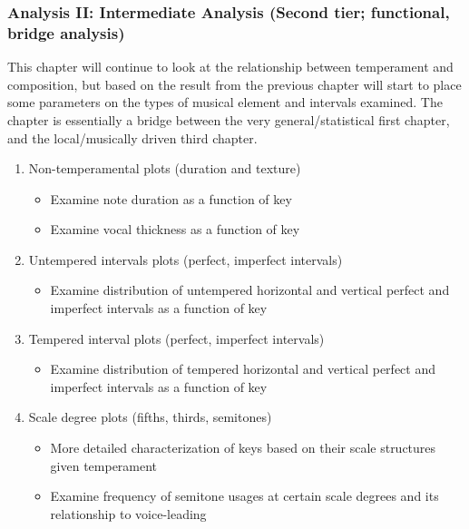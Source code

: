 \subsubsection{Analysis II: Intermediate Analysis (Second tier;
functional, bridge
analysis)}\label{analysis-ii-intermediate-analysis-second-tier-functional-bridge-analysis}

This chapter will continue to look at the relationship between
temperament and composition, but based on the result from the previous
chapter will start to place some parameters on the types of musical
element and intervals examined. The chapter is essentially a bridge
between the very general/statistical first chapter, and the
local/musically driven third chapter.

\begin{enumerate}
\def\labelenumi{\arabic{enumi}.}
\tightlist
\item
  Non-temperamental plots (duration and texture)

  \begin{itemize}
  \tightlist
  \item
    Examine note duration as a function of key
  \item
    Examine vocal thickness as a function of key
  \end{itemize}
\item
  Untempered intervals plots (perfect, imperfect intervals)

  \begin{itemize}
  \tightlist
  \item
    Examine distribution of untempered horizontal and vertical perfect
    and imperfect intervals as a function of key
  \end{itemize}
\item
  Tempered interval plots (perfect, imperfect intervals)

  \begin{itemize}
  \tightlist
  \item
    Examine distribution of tempered horizontal and vertical perfect and
    imperfect intervals as a function of key
  \end{itemize}
\item
  Scale degree plots (fifths, thirds, semitones)

  \begin{itemize}
  \tightlist
  \item
    More detailed characterization of keys based on their scale
    structures given temperament
  \item
    Examine frequency of semitone usages at certain scale degrees and
    its relationship to voice-leading
  \end{itemize}
\end{enumerate}

